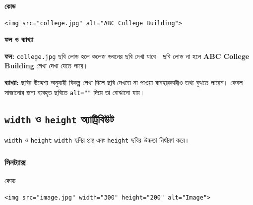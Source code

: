 \par\noindent
\begin{minipage}[t]{.54\linewidth}\vspace{0pt}\small
\textbf{\color{chFourTeal}কোড}\par
\begin{verbatim}
<img src="college.jpg" alt="ABC College Building">
\end{verbatim}

\par\smallskip
\end{minipage}\hfill
\begin{minipage}[t]{.42\linewidth}\vspace{0pt}\small
\textbf{\color{chFourTeal}ফল ও ব্যাখ্যা}\par
\textbf{ফল:} \texttt{college.jpg} ছবি লোড হলে কলেজ ভবনের ছবি দেখা যাবে। ছবি লোড না হলে \textbf{ABC College Building} লেখা দেখা যেতে পারে।

\textbf{ব্যাখ্যা:} ছবির উদ্দেশ্য অনুযায়ী বিকল্প লেখা দিলে ছবি দেখতে না পাওয়া ব্যবহারকারীও তথ্য বুঝতে পারেন। কেবল সাজানোর জন্য ব্যবহৃত ছবিতে \texttt{alt=""} দিয়ে তা বোঝানো যায়।
\par\smallskip
\end{minipage}\par





\subsection{\texttt{width} ও \texttt{height} অ্যাট্রিবিউট}

\begin{definitionbox}{\texttt{width} ও \texttt{height}}
\texttt{width} ছবির প্রস্থ এবং \texttt{height} ছবির উচ্চতা নির্ধারণ করে।
\end{definitionbox}

\subsubsection{সিনট্যাক্স}

\begin{examplebox}{কোড}
\par\noindent\begin{minipage}{\linewidth}
\begin{verbatim}
<img src="image.jpg" width="300" height="200" alt="Image">
\end{verbatim}
\end{minipage}\par
\end{examplebox}

